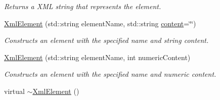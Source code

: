 \begin{DoxyCompactItemize}
\begin{DoxyCompactList}\small\item\em Returns a X\+M\+L string that represents the element. \end{DoxyCompactList}\item 
\hyperlink{class_xml_element_a94d6c15e996994d62316b198f369d675}{Xml\+Element} (std\+::string element\+Name, std\+::string \hyperlink{class_xml_element_a3fea4e46ca4e63ceb905a96a8f304381}{content}=\char`\"{}\char`\"{})
\begin{DoxyCompactList}\small\item\em Constructs an element with the specified name and string content. \end{DoxyCompactList}\item 
\hyperlink{class_xml_element_a879b90d96dc87b6f7ebb9c67ba92cb73}{Xml\+Element} (std\+::string element\+Name, int numeric\+Content)
\begin{DoxyCompactList}\small\item\em Constructs an element with the specified name and numeric content. \end{DoxyCompactList}\item 
\hypertarget{class_xml_element_ac862c3db543830858fba97c6196afd6b}{virtual \hyperlink{class_xml_element_ac862c3db543830858fba97c6196afd6b}{$\sim$\+Xml\+Element} ()}\label{class_xml_element_ac862c3db543830858fba97c6196afd6b}


\end{DoxyCompactItemize}
